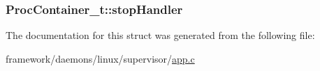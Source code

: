 \subsubsection[{\texorpdfstring{stop\+Handler}{stopHandler}}]{ Proc\+Container\+\_\+t\+::stop\+Handler}\hypertarget{struct_proc_container__t_af28816ad5c97cf6f3edd300a487f93b0}{}\label{struct_proc_container__t_af28816ad5c97cf6f3edd300a487f93b0}


The documentation for this struct was generated from the following file\+:\begin{DoxyCompactItemize}
\item 
framework/daemons/linux/supervisor/\hyperlink{supervisor_2app_8c}{app.\+c}\end{DoxyCompactItemize}

